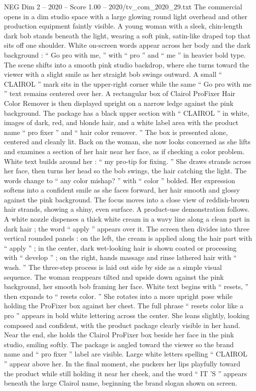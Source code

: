 \begin{textsample}{NEG Dim 2 – 2020 – Score 1.00 – 2020/tv\_com\_2020\_29.txt}  \label{ex:f2_neg_054}
The commercial opens in a dim studio space with a large glowing round light overhead and other production equipment faintly visible.
A young woman with a sleek, chin-length dark bob stands beneath the light, wearing a soft pink, satin-like draped top that sits off one shoulder.
White on-screen words appear across her body and the dark background : “ Go pro with me, ” with “ pro ” and “ me ” in heavier bold type.
The scene shifts into a smooth pink studio backdrop, where she turns toward the viewer with a slight smile as her straight bob swings outward.
A small “ CLAIROL ” mark sits in the upper-right corner while the same “ Go pro with me ” text remains centered over her.
A rectangular box of Clairol ProFixer Hair Color Remover is then displayed upright on a narrow ledge against the pink background.
The package has a black upper section with “ CLAIROL ” in white, images of dark, red, and blonde hair, and a white label area with the product name “ pro fixer ” and “ hair color remover. ” The box is presented alone, centered and cleanly lit.
Back on the woman, she now looks concerned as she lifts and examines a section of her hair near her face, as if checking a color problem.
White text builds around her : “ my pro-tip for fixing. ” She draws strands across her face, then turns her head so the bob swings, the hair catching the light.
The words change to “ any color mishap? ” with “ color ” bolded.
Her expression softens into a confident smile as she faces forward, her hair smooth and glossy against the pink background.
The focus moves into a close view of reddish-brown hair strands, showing a shiny, even surface.
A product-use demonstration follows.
A white nozzle dispenses a thick white cream in a wavy line along a clean part in dark hair ; the word “ apply ” appears over it.
The screen then divides into three vertical rounded panels : on the left, the cream is applied along the hair part with “ apply ” ; in the center, dark wet-looking hair is shown coated or processing with “ develop ” ; on the right, hands massage and rinse lathered hair with “ wash. ” The three-step process is laid out side by side as a simple visual sequence.
The woman reappears tilted and upside down against the pink background, her smooth bob framing her face.
White text begins with “ resets, ” then expands to “ resets color. ” She rotates into a more upright pose while holding the ProFixer box against her chest.
The full phrase “ resets color like a pro ” appears in bold white lettering across the center.
She leans slightly, looking composed and confident, with the product package clearly visible in her hand.
Near the end, she holds the Clairol ProFixer box beside her face in the pink studio, smiling softly.
The package is angled toward the viewer so the brand name and “ pro fixer ” label are visible.
Large white letters spelling “ CLAIROL ” appear above her.
In the final moment, she puckers her lips playfully toward the product while still holding it near her cheek, and the word “ IT ’S ” appears beneath the large Clairol name, beginning the brand slogan shown on screen.

\end{textsample}
